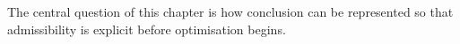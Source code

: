 The central question of this chapter is how conclusion can be represented so that admissibility is explicit before optimisation begins.
